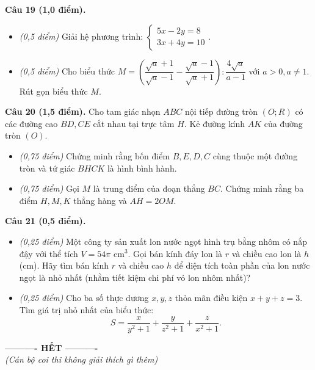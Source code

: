 \documentclass[11pt,a4paper]{article}
\begin{document}
\vspace{2mm}
\textbf{Câu 19 (1,0 điểm).}
\begin{itemize}
  \item[a)] \textit{(0,5 điểm)} Giải hệ phương trình: $\begin{cases} 5x - 2y = 8 \\ 3x + 4y = 10 \end{cases}$.
  \item[b)] \textit{(0,5 điểm)} Cho biểu thức $M = \left( \dfrac{\sqrt{a}+1}{\sqrt{a}-1} - \dfrac{\sqrt{a}-1}{\sqrt{a}+1} \right) : \dfrac{4\sqrt{a}}{a-1}$ với $a > 0, a \ne 1$. Rút gọn biểu thức $M$.
\end{itemize}

\vspace{2mm}
\textbf{Câu 20 (1,5 điểm).} Cho tam giác nhọn $ABC$ nội tiếp đường tròn $(O; R)$ có các đường cao $BD, CE$ cắt nhau tại trực tâm $H$. Kẻ đường kính $AK$ của đường tròn $(O)$.
\begin{itemize}
  \item[a)] \textit{(0,75 điểm)} Chứng minh rằng bốn điểm $B, E, D, C$ cùng thuộc một đường tròn và tứ giác $BHCK$ là hình bình hành.
  \item[b)] \textit{(0,75 điểm)} Gọi $M$ là trung điểm của đoạn thẳng $BC$. Chứng minh rằng ba điểm $H, M, K$ thẳng hàng và $AH = 2 OM$.
\end{itemize}

\vspace{2mm}
\textbf{Câu 21 (0,5 điểm).}
\begin{itemize}
  \item[a)] \textit{(0,25 điểm)} Một công ty sản xuất lon nước ngọt hình trụ bằng nhôm có nắp đậy với thể tích $V = 54\pi\text{ cm}^3$. Gọi bán kính đáy lon là $r$ và chiều cao lon là $h$ (cm). Hãy tìm bán kính $r$ và chiều cao $h$ để diện tích toàn phần của lon nước ngọt là nhỏ nhất (nhằm tiết kiệm chi phí vỏ lon nhôm nhất)?
  \item[b)] \textit{(0,25 điểm)} Cho ba số thực dương $x, y, z$ thỏa mãn điều kiện $x + y + z = 3$. Tìm giá trị nhỏ nhất của biểu thức:
  \[
  S = \dfrac{x}{y^2 + 1} + \dfrac{y}{z^2 + 1} + \dfrac{z}{x^2 + 1}.
  \]
\end{itemize}

\vspace{4mm}
\begin{center}
\textbf{---------- HẾT ----------}\\
\textit{(Cán bộ coi thi không giải thích gì thêm)}
\end{center}
\end{document}
